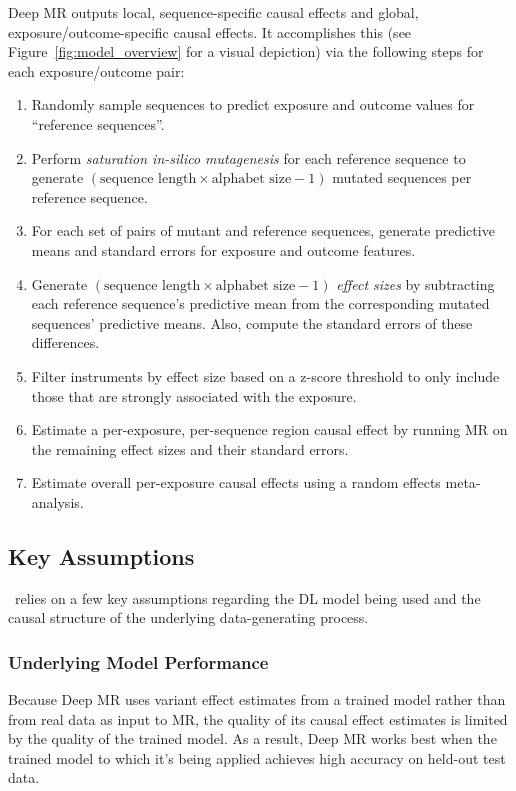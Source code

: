 Deep MR outputs local, sequence-specific causal effects and global, exposure/outcome-specific causal effects. It accomplishes this (see Figure~\ref{fig:model_overview} for a visual depiction) via the following steps for each exposure/outcome pair:
\begin{enumerate}
    \item Randomly sample sequences to predict exposure and outcome values for ``reference sequences''.
    \item Perform \textit{saturation in-silico mutagenesis} for each reference sequence to generate \( (\text{sequence\ length} \times \text{alphabet\ size} - 1) \) mutated sequences per reference sequence.
    \item For each set of pairs of mutant and reference sequences, generate predictive means and standard errors for exposure and outcome features.
    \item Generate \( (\text{sequence length} \times \text{alphabet size} - 1) \) \textit{effect sizes} by subtracting each reference sequence's predictive mean from the corresponding mutated sequences' predictive means. Also, compute the standard errors of these differences.
    \item Filter instruments by effect size based on a z-score threshold to only include those that are strongly associated with the exposure. \label{item:instr_filtering}
    \item Estimate a per-exposure, per-sequence region causal effect by running MR on the remaining effect sizes and their standard errors.
    \item Estimate overall per-exposure causal effects using a random effects meta-analysis.
\end{enumerate}

\subsection{Key Assumptions}%
\label{sub:meth_key_assumptions}
\method\ relies on a few key assumptions regarding the DL model being used and the causal structure of the underlying data-generating process.

\subsubsection{Underlying Model Performance}%
\label{ssub:underlying_model_performance}
Because Deep MR uses variant effect estimates from a trained model rather than from real data as input to MR, the quality of its causal effect estimates is limited by the quality of the trained model. As a result, Deep MR works best when the trained model to which it's being applied achieves high accuracy on held-out test data.

